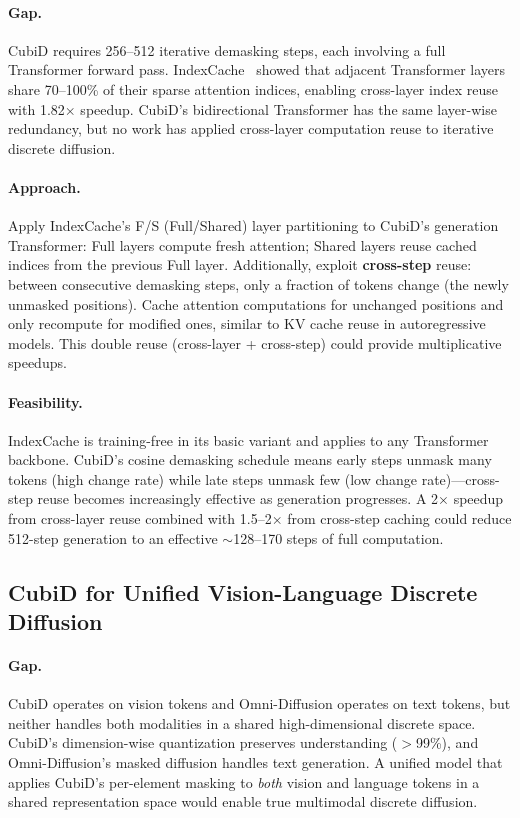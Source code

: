 \documentclass[11pt]{article}
\begin{document}
\paragraph{Gap.}
CubiD requires 256--512 iterative demasking steps, each involving a full Transformer forward pass.
IndexCache~\cite{indexcache} showed that adjacent Transformer layers share 70--100\% of their sparse attention indices, enabling cross-layer index reuse with 1.82$\times$ speedup.
CubiD's bidirectional Transformer has the same layer-wise redundancy, but no work has applied cross-layer computation reuse to iterative discrete diffusion.

\paragraph{Approach.}
Apply IndexCache's F/S (Full/Shared) layer partitioning to CubiD's generation Transformer: Full layers compute fresh attention; Shared layers reuse cached indices from the previous Full layer.
Additionally, exploit \textbf{cross-step} reuse: between consecutive demasking steps, only a fraction of tokens change (the newly unmasked positions).
Cache attention computations for unchanged positions and only recompute for modified ones, similar to KV cache reuse in autoregressive models.
This double reuse (cross-layer + cross-step) could provide multiplicative speedups.

\paragraph{Feasibility.}
IndexCache is training-free in its basic variant and applies to any Transformer backbone.
CubiD's cosine demasking schedule means early steps unmask many tokens (high change rate) while late steps unmask few (low change rate)---cross-step reuse becomes increasingly effective as generation progresses.
A 2$\times$ speedup from cross-layer reuse combined with 1.5--2$\times$ from cross-step caching could reduce 512-step generation to an effective $\sim$128--170 steps of full computation.

\subsection{CubiD for Unified Vision-Language Discrete Diffusion}

\paragraph{Gap.}
CubiD operates on vision tokens and Omni-Diffusion operates on text tokens, but neither handles both modalities in a shared high-dimensional discrete space.
CubiD's dimension-wise quantization preserves understanding ($>$99\%), and Omni-Diffusion's masked diffusion handles text generation.
A unified model that applies CubiD's per-element masking to \emph{both} vision and language tokens in a shared representation space would enable true multimodal discrete diffusion.
\end{document}
